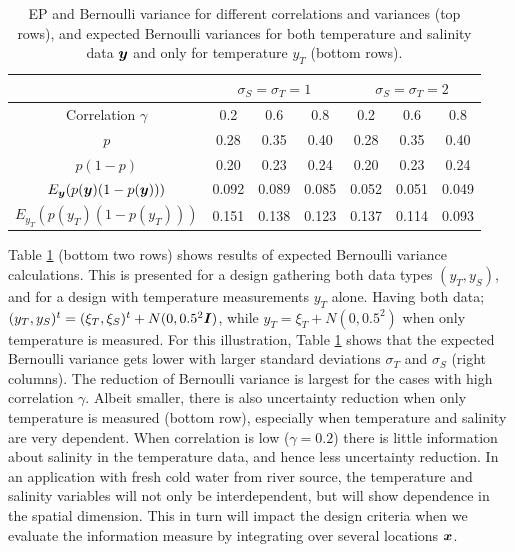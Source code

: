 \documentclass[aoas]{imsart}
\begin{document}
\begin{table}[!h] \centering \caption{EP and Bernoulli variance for
    different correlations and variances (top rows), and expected
    Bernoulli variances for both temperature and salinity data ${\boldsymbol y}$ and only for
    temperature $y_T$ (bottom rows).}
  \begin{tabular}{c|ccc|ccc}
 &\multicolumn{3}{c}{$\sigma_S=\sigma_T=1$} & \multicolumn{3}{c}{$\sigma_S=\sigma_T=2$} \\
\hline
Correlation $\gamma$ & 0.2 & 0.6 & 0.8 & 0.2 & 0.6 & 0.8 \\
\hline
$p$ & 0.28 & 0.35 & 0.40 & 0.28 & 0.35 & 0.40 \\ 
$p(1-p)$ & 0.20 & 0.23 & 0.24 & 0.20 & 0.23 & 0.24 \\ 
$E_{{\boldsymbol y}}(p({\boldsymbol y}) (1-p({\boldsymbol y})))$ & 0.092 & 0.089 & 0.085 & 0.052 & 0.051 & 0.049 \\ 
$E_{y_T}(p(y_T) (1-p(y_T)))$ & 0.151 & 0.138 & 0.123 & 0.137 & 0.114 & 0.093 \\ 
\hline
\end{tabular}
\label{tab:sim_rhoab}
\end{table}

Table \ref{tab:sim_rhoab} (bottom two rows) shows results of expected
Bernoulli variance calculations. This is presented for a design
gathering both data types $(y_T,y_S)$, and for a design with
temperature measurements $y_T$ alone. Having both data;
$(y_T,y_S)^t=(\xi_T,\xi_S)^t+N(0,0.5^2{\boldsymbol I})$, while
$y_T=\xi_T+N(0,0.5^2)$ when only temperature is measured.  For this illustration, Table \ref{tab:sim_rhoab} shows that the expected Bernoulli variance
gets lower with larger standard deviations $\sigma_T$ and $\sigma_S$
(right columns). The reduction of Bernoulli variance is largest
for the cases with high correlation $\gamma$. Albeit smaller, there is
also uncertainty reduction when only temperature is measured (bottom
row), especially when temperature and salinity are very
dependent. When correlation is low ($\gamma=0.2$) there is little
information about salinity in the temperature data, and hence less
uncertainty reduction. In an application with fresh cold water from
river source, the temperature and salinity variables will not only be
interdependent, but will show dependence in the spatial
dimension. This in turn will impact the design criteria when we
evaluate the information measure by integrating over several locations
${\boldsymbol x}$.

\end{document}
